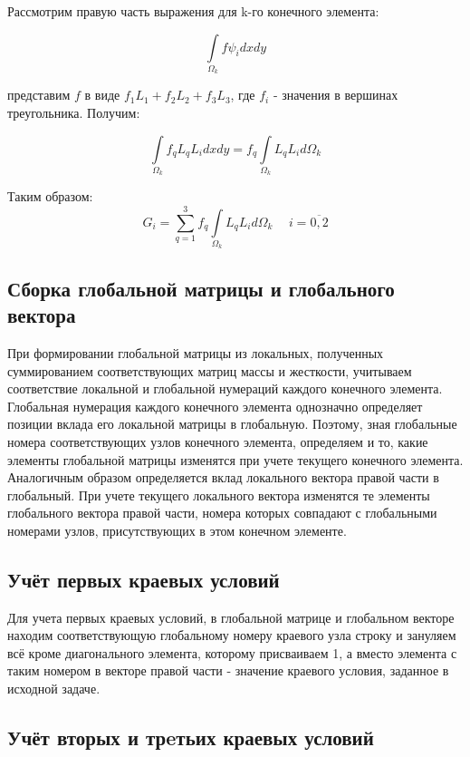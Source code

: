 \documentclass[12pt,a4paper]{article}
\begin{document}
Рассмотрим правую часть выражения для k-го конечного элемента:

$$
\int \limits_{\Omega_k} f \psi_i dxdy
$$

\noindent представим $f$ в виде $f_1 L_1 + f_2 L_2 + f_3 L_3$, где
$f_i$ - значения в вершинах треугольника. Получим:

$$
\int \limits_{\Omega_k} f_q L_q L_i dxdy =
    f_q \int \limits_{\Omega_k} L_q L_i d \Omega_k
$$

\noindent Таким образом:
$$
G_i = \sum \limits_{q=1}^{3}
    f_q \int \limits_{\Omega_k} L_q L_i d\Omega_k
    \hspace{15pt} i=\overline{0,2}
$$

\subsection*{Сборка глобальной матрицы и глобального вектора}

При формировании глобальной матрицы из локальных,
полученных суммированием соответствующих матриц
массы и жесткости, учитываем соответствие локальной
и глобальной нумераций каждого конечного элемента.
Глобальная нумерация каждого конечного элемента
однозначно определяет позиции вклада его локальной
матрицы в глобальную. Поэтому, зная глобальные
номера соответствующих узлов конечного элемента,
определяем и то, какие элементы глобальной матрицы
изменятся при учете текущего конечного элемента.
Аналогичным образом определяется вклад локального
вектора правой части в глобальный. При учете
текущего локального вектора изменятся те элементы
глобального вектора правой части, номера которых
совпадают с глобальными номерами узлов, присутствующих
в этом конечном элементе.

\subsection*{Учёт первых краевых условий}

Для учета первых краевых условий, в глобальной матрице
и глобальном векторе находим соответствующую глобальному
номеру краевого узла строку и зануляем всё кроме
диагонального элемента, которому присваиваем 1, а вместо
элемента с таким номером в векторе правой части - значение
краевого условия, заданное в исходной задаче.


\subsection*{Учёт вторых и трeтьих краевых условий}
\end{document}
